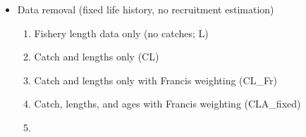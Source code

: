 \documentclass[11pt,
  english,
  a4paper,
]{article}
\begin{document}
\begin{itemize}
\item

  Data removal (fixed life history, no recruitment estimation)

  \tagmcend\tagstructend\tagstructend


  \begin{enumerate}
  \def\labelenumi{\arabic{enumi}.}
  \item


    Fishery length data only (no catches; L)

    \tagmcend\tagstructend\tagstructend

    \tagmcend\tagstructend\tagstructend
  \item


    Catch and lengths only (CL)

    \tagmcend\tagstructend\tagstructend

    \tagmcend\tagstructend\tagstructend
  \item


    Catch and lengths only with Francis weighting (CL\_Fr)

    \tagmcend\tagstructend\tagstructend

    \tagmcend\tagstructend\tagstructend
  \item


    Catch, lengths, and ages with Francis weighting (CLA\_fixed)

    \tagmcend\tagstructend\tagstructend

    \tagmcend\tagstructend\tagstructend
  \item


\end{enumerate}
\end{itemize}
\end{document}
